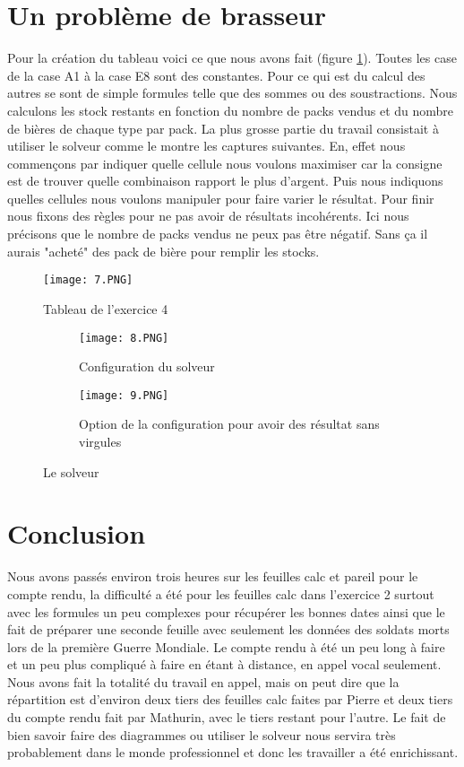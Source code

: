 \documentclass[10pt,a4paper]{article}
\begin{document}
\section{Un problème de brasseur}
Pour la création du tableau voici ce que nous avons fait (figure \ref{fig6}). Toutes les case de la case A1 à la case E8 sont des constantes. Pour ce qui est du calcul des autres se sont de simple formules telle que des sommes ou des soustractions. Nous calculons les stock restants en fonction du nombre de packs vendus et du nombre de bières de chaque type par pack. La plus grosse partie du travail consistait à utiliser le solveur comme le montre les captures suivantes. En, effet nous commençons par indiquer quelle cellule nous voulons maximiser car la consigne est de trouver quelle combinaison rapport le plus d'argent. Puis nous indiquons quelles cellules nous voulons manipuler pour faire varier le résultat. Pour finir nous fixons des règles pour ne pas avoir de résultats incohérents. Ici nous précisons que le nombre de packs vendus ne peux pas être négatif. Sans ça il aurais "acheté" des pack de bière pour remplir les stocks. 
\begin{figure}[!h]
  \centering
  \texttt{[image: 7.PNG]}
  \caption{Tableau de l'exercice 4}
  \label{fig6}
\end{figure}

\begin{figure}[!h]
\begin{subfigure}{.45\textwidth}
  \centering
  \texttt{[image: 8.PNG]}
  \caption{Configuration du solveur}
  \label{fig6a}
\end{subfigure}
\begin{subfigure}{.55\textwidth}
  \centering
  \texttt{[image: 9.PNG]}
  \caption{Option de la configuration pour avoir des résultat sans virgules}
  \label{fig6b}
\end{subfigure}
\caption{Le solveur}
\label{fig7}
\end{figure}

\section{Conclusion}
Nous avons passés environ trois heures sur les feuilles calc et pareil pour le compte rendu, la difficulté a été pour les feuilles calc dans l'exercice 2 surtout avec les formules un peu complexes pour récupérer les bonnes dates ainsi que le fait de préparer une seconde feuille avec seulement les données des soldats morts lors de la première Guerre Mondiale. Le compte rendu à été un peu long à faire et un peu plus compliqué à faire en étant à distance, en appel vocal seulement. Nous avons fait la totalité du travail en appel, mais on peut dire que la répartition est d'environ deux tiers des feuilles calc faites par Pierre et deux tiers du compte rendu fait par Mathurin, avec le tiers restant pour l'autre. Le fait de bien savoir faire des diagrammes ou utiliser le solveur nous servira très probablement dans le monde professionnel et donc les travailler a été enrichissant.
\end{document}
